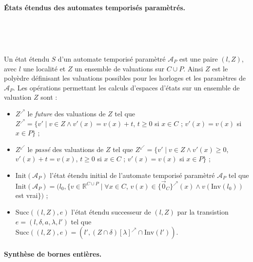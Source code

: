 \documentclass{article}
\begin{document}
      \paragraph{États étendus des automates temporisés paramètrés.} ~

        ~


        Un état étendu $S$ d'un automate temporisé paramètré $\mathcal{A}_P$ est
        une paire $(l,Z)$, avec $l$ une localité et $Z$ un ensemble de
        valuations sur $C \cup P$. Ainsi $Z$ est le polyèdre définisant les
        valuations possibles pour les horloges et les paramètres de
        $\mathcal{A}_P$. Les opérations permettant les calculs d'espaces d'états
        sur un ensemble de valuation $Z$ sont :

        \begin{itemize}
          \item $Z^\nearrow$ le {\it future} des valuations de $Z$ tel que
            $Z^\nearrow = \{ v' \mid v \in Z \wedge v'(x) = v(x) + t$, $t \geq
            0$ si $x \in C$ ; $v'(x) = v(x)$ si $x \in P \}$ ;
          \item $Z^\swarrow$ le {\it passé} des valuations de $Z$ tel que
            $Z^\swarrow = \{ v' \mid v \in Z \wedge v'(x) \geq 0$, $v'(x) + t =
            v(x)$, $t \geq 0$ si $x \in C$ ; $ v'(x) = v(x)$ si $x \in P \}$ ;
          \item $\mathrm{Init}(\mathcal{A}_P)$ l'état étendu initial de
            l'automate temporisé paramètré $\mathcal{A}_P$ tel que
            $\mathrm{Init}(\mathcal{A}_P) = (l_0, \{ v \in \mathbb{R}^{C \cup P}
            \mid \forall x \in C$, $v(x) \in \{\vec{0}_C\}^\nearrow(x) \wedge
            v(\mathrm{Inv}(l_0))$ est vrai$\})$ ;
          \item $\mathrm{Succ}((l, Z), e)$ l'état étendu successeur de $(l, Z)$
            par la transistion $e = (l, \delta, a, \lambda, l')$ tel que
            $\mathrm{Succ}((l, Z), e) = (l', (Z \cap \delta)[\lambda]^\nearrow
            \cap \mathrm{Inv}(l'))$.
        \end{itemize}


      \paragraph{Synthèse de bornes entières.} ~
      
\end{document}
